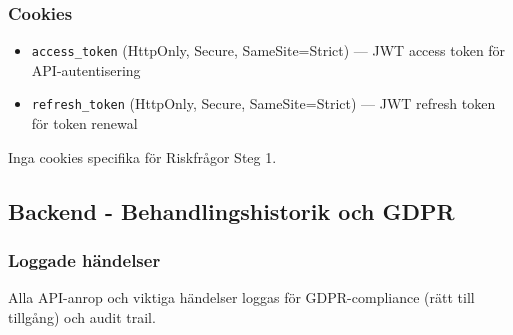 \documentclass[12pt,a4paper]{article}
\begin{document}
\subsubsection{Cookies}

\begin{itemize}[noitemsep]
  \item \texttt{access\_token} (HttpOnly, Secure, SameSite=Strict) — JWT access token för API-autentisering
  \item \texttt{refresh\_token} (HttpOnly, Secure, SameSite=Strict) — JWT refresh token för token renewal
\end{itemize}

Inga cookies specifika för Riskfrågor Steg 1.

\subsection{Backend - Behandlingshistorik och GDPR}

\subsubsection{Loggade händelser}

Alla API-anrop och viktiga händelser loggas för GDPR-compliance (rätt till tillgång) och audit trail.
\end{document}
